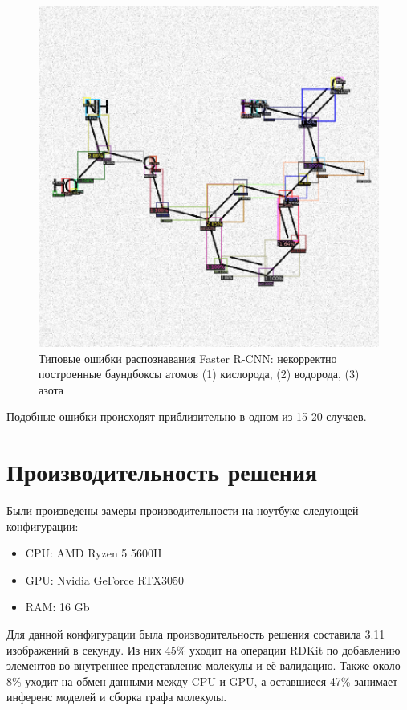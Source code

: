 \begin{figure}[ht!]
	\includegraphics [scale=0.28] {my_folder/images/inference3}
	\caption{Типовые ошибки распознавания Faster R-CNN: некорректно построенные баундбоксы атомов (1) кислорода, (2) водорода, (3) азота}
	\label{fig:mistake}
\end{figure}

Подобные ошибки происходят приблизительно в одном из 15-20 случаев.

\section{Производительность решения} \label{ch3:sec4}

Были произведены замеры производительности на ноутбуке следующей конфигурации:

\begin{itemize}
	\item CPU: AMD Ryzen 5 5600H
	\item GPU: Nvidia GeForce RTX3050
	\item RAM: 16 Gb
\end{itemize}

Для данной конфигурации была производительность решения составила 3.11 изображений в секунду. Из них 45\% уходит на операции RDKit по добавлению элементов во внутреннее представление молекулы и её валидацию. Также около 8\% уходит на обмен данными между CPU и GPU, а оставшиеся 47\% занимает инференс моделей и сборка графа молекулы.




%
